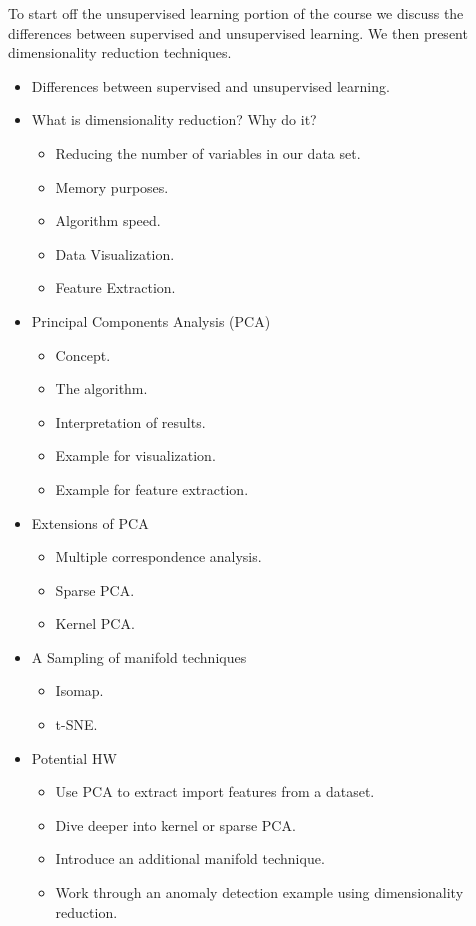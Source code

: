 \documentclass[12pt]{article}
\begin{document}
	\noindent
	To start off the unsupervised learning portion of the course we discuss the differences between supervised and unsupervised learning. We then present dimensionality reduction techniques.
	\begin{itemize}
		\item Differences between supervised and unsupervised learning.
		\item What is dimensionality reduction? Why do it?
			\begin{itemize}
				\item Reducing the number of variables in our data set.
				\item Memory purposes.
				\item Algorithm speed.
				\item Data Visualization.
				\item Feature Extraction.
			\end{itemize}
		\item Principal Components Analysis (PCA)
			\begin{itemize}
				\item Concept.
				\item The algorithm.
				\item Interpretation of results.
				\item Example for visualization.
				\item Example for feature extraction.
			\end{itemize}
		\item Extensions of PCA
			\begin{itemize}
				\item Multiple correspondence analysis.
				\item Sparse PCA.
				\item Kernel PCA.
			\end{itemize}
		\item A Sampling of manifold techniques
			\begin{itemize}
				\item Isomap.
				\item t-SNE.
			\end{itemize}
		\item Potential HW
			\begin{itemize}
				\item Use PCA to extract import features from a dataset.
				\item Dive deeper into kernel or sparse PCA.
				\item Introduce an additional manifold technique.
				\item Work through an anomaly detection example using dimensionality reduction.
			\end{itemize}
	\end{itemize}
	
\end{document}
